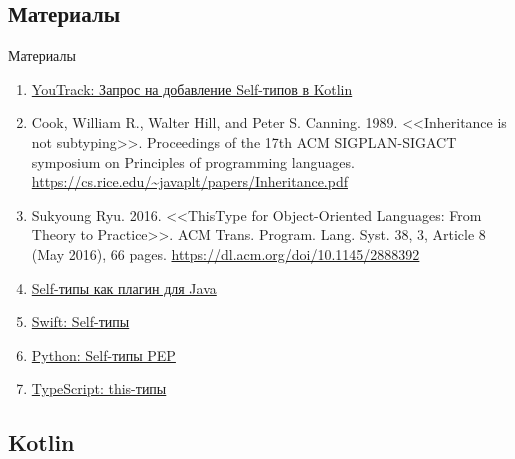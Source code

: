 \documentclass[usenames, dvipsnames]{beamer}
\begin{document}
    \subsection{Материалы}

    \begin{frame}{Материалы}
        \begin{enumerate}
            \item \href{https://youtrack.jetbrains.com/issue/KT-6494}{\color{blue} YouTrack: Запрос на добавление Self-типов в Kotlin}
            \item Cook, William R., Walter Hill, and Peter S. Canning. 1989. <<Inheritance is not subtyping>>. Proceedings of the 17th ACM SIGPLAN-SIGACT symposium on Principles of programming languages. {\color{blue}\url{https://cs.rice.edu/~javaplt/papers/Inheritance.pdf}}
            \item Sukyoung Ryu. 2016. <<ThisType for Object-Oriented Languages: From Theory to Practice>>. ACM Trans. Program. Lang. Syst. 38, 3, Article 8 (May 2016), 66 pages. {\color{blue}\url{https://dl.acm.org/doi/10.1145/2888392}}
            \item \href{https://github.com/manifold-systems/manifold/blob/master/manifold-deps-parent/manifold-ext/README.md\#the-self-type-with-self}{\color{blue} Self-типы как плагин для Java}
            \item \href{https://docs.swift.org/swift-book/documentation/the-swift-programming-language/types/\#Self-Type}{\color{blue} Swift: Self-типы}
            \item \href{https://peps.python.org/pep-0673/}{\color{blue} Python: Self-типы PEP}
            \item \href{https://www.typescriptlang.org/docs/handbook/2/classes.html\#this-types}{\color{blue}TypeScript: this-типы}
        \end{enumerate}
    \end{frame}


    \subsection{Kotlin}
\end{document}
